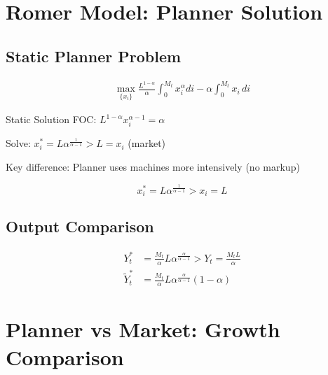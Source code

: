 \documentclass[a4paper,11pt]{article}
\begin{document}
\clearpage

\section{Romer Model: Planner Solution}

\subsection*{Static Planner Problem}
\begin{align*}
\max_{\{x_i\}} \frac{L^{1-\alpha}}{\alpha} \int_0^{M_t} x_i^\alpha di - \alpha \int_0^{M_t} x_i \, di
\tag{Static Planner}
\end{align*}

\begin{derivationbox}{Static Solution}
FOC: $L^{1-\alpha} x_i^{\alpha-1} = \alpha$

Solve: $x_i^* = L \alpha^{\frac{1}{\alpha-1}} > L = x_i$ (market)

Key difference: Planner uses machines more intensively (no markup)
\end{derivationbox}

\begin{resultbox}
\[
\boxed{x_i^* = L \alpha^{\frac{1}{\alpha-1}} > x_i = L}
\tag{Planner Input}
\]
\end{resultbox}

\medskip
\subsection*{Output Comparison}
\begin{align*}
Y_t^* &= \frac{M_t}{\alpha} L \alpha^{\frac{\alpha}{\alpha-1}} > Y_t = \frac{M_t L}{\alpha} \tag{Planner Output} \\
\tilde{Y}_t^* &= \frac{M_t}{\alpha} L \alpha^{\frac{\alpha}{\alpha-1}}(1-\alpha) \tag{Planner Net Output}
\end{align*}

\clearpage

\section{Planner vs Market: Growth Comparison}
\end{document}
